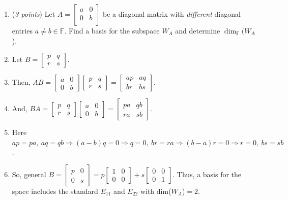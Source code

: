 \documentclass[11pt]{article}
\newcommand{\bbF}{\mathbb{F}}
\theoremstyle{definition}
\numberwithin{equation}{subsection}
\begin{document}
\begin{enumerate}
\begin{enumerate}
\item (\emph{3 points}) Let $A=\begin{bmatrix} a & 0\\ 0 & b\\\end{bmatrix}$ be a diagonal matrix with \emph{different} diagonal entries $a\neq b \in\mathbb{F}$. Find a basis for the subspace $W_A$ and determine $\dim_{\bbF}(W_A$).
\item[] Let $B=\begin{bmatrix}p&q\\r&s\end{bmatrix}$.
\item[] Then, $AB=\begin{bmatrix}a&0\\0&b\end{bmatrix}\begin{bmatrix}p&q\\r&s\end{bmatrix}=\begin{bmatrix}ap&aq\\br&bs\end{bmatrix}$.
\item[] And, $BA=\begin{bmatrix}p&q\\r&s\end{bmatrix}\begin{bmatrix}a&0\\0&b\end{bmatrix}=\begin{bmatrix}pa&qb\\ra&sb\end{bmatrix}$.
\item[] Here $ap=pa,\ aq=qb\Rightarrow (a-b)q=0\Rightarrow q=0,\ br=ra\Rightarrow (b-a)r=0\Rightarrow r=0,\ bs=sb$.
\item[] So, general $B=\begin{bmatrix}p&0\\0&s\end{bmatrix}=p\begin{bmatrix}1&0\\0&0\end{bmatrix}+s\begin{bmatrix}0&0\\0&1\end{bmatrix}$. Thus, a basis for the space includes the standard $E_{11}$ and $E_{22}$ with dim($W_A$)$=2$.

\end{enumerate}


\end{enumerate}
\end{document}

